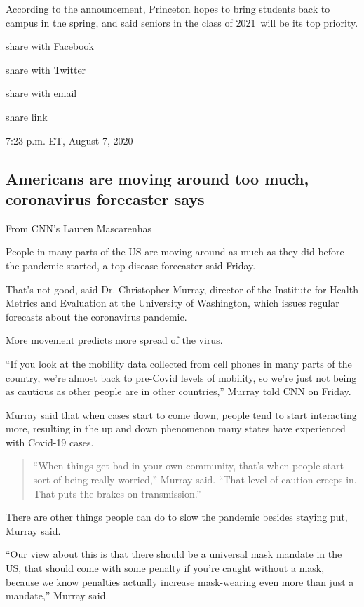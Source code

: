 According to the announcement, Princeton hopes to bring students back to
campus in the spring, and said seniors in the class of 2021~will be its
top priority.

share with Facebook

share with Twitter

share with email

share link

7:23 p.m. ET, August 7, 2020

\hypertarget{americans-are-moving-around-too-much-coronavirus-forecaster-says}{%
\subsection{Americans are moving around too much, coronavirus forecaster
says}\label{americans-are-moving-around-too-much-coronavirus-forecaster-says}}

From CNN's Lauren Mascarenhas

People in many parts of the US are moving around as much as they did
before the pandemic started, a top disease forecaster said Friday.

That's not good, said Dr. Christopher Murray, director of the Institute
for Health Metrics and Evaluation at the University of Washington, which
issues regular forecasts about the coronavirus pandemic.

More movement predicts more spread of the virus.

``If you look at the mobility data collected from cell phones in many
parts of the country, we're almost back to pre-Covid levels of mobility,
so we're just not being as cautious as other people are in other
countries,'' Murray told CNN on Friday.

Murray said that when cases start to come down, people tend to start
interacting more, resulting in the up and down phenomenon many states
have experienced with Covid-19 cases.~

\begin{quote}
``When things get bad in your own community, that's when people start
sort of being really worried,'' Murray said. ``That level of caution
creeps in. That puts the brakes on transmission.''
\end{quote}

There are other things people can do to slow the pandemic besides
staying put, Murray said.

``Our view about this is that there should be a universal mask mandate
in the US, that should come with some penalty if you're caught without a
mask, because we know penalties actually increase mask-wearing even more
than just a mandate,'' Murray said.~

